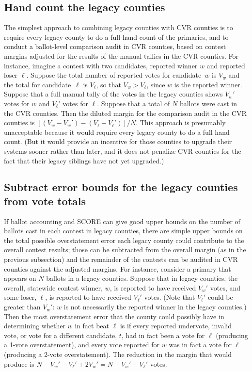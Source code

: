 \documentclass[12pt]{article}
\begin{document}
\subsection{Hand count the legacy counties}
The simplest approach to combining legacy counties with CVR counties is to require every
legacy county to do a full hand count of the primaries, and to conduct a 
ballot-level comparison audit in CVR counties, based on contest margins adjusted for
the results of the manual tallies in the CVR counties.
For instance, imagine a contest with two candidates, reported winner $w$ and reported loser $\ell$.
Suppose the total number of reported votes for candidate~$w$ is $V_w$ 
and the total for candidate~$\ell$ is $V_\ell$, so that $V_w > V_\ell$, since 
$w$ is the reported winner.
Suppose that a full manual tally of the votes in the legacy counties shows $V_w'$ votes for $w$ and
$V_\ell'$ votes for $\ell$.
Suppose that a total of $N$ ballots were cast in the CVR counties.
Then the diluted margin for the comparison audit in the CVR counties is 
$[(V_w-V_w')-(V_\ell-V_\ell')]/N$.
This approach is presumably unacceptable because it would require every legacy county to do a full hand
count. 
(But it would provide an incentive for those counties to upgrade their systems
sooner rather than later, and it does not penalize CVR counties for the fact that their
legacy siblings have not yet upgraded.)

\subsection{Subtract error bounds for the legacy counties from vote totals}
If ballot accounting and SCORE can give good upper bounds on the number of ballots cast in
each contest in legacy counties, there are simple upper bounds on the total
possible overstatement error each legacy county could contribute to the overall contest
results; those can be subtracted from the overall margin (as in the previous subsection) and the
remainder of the contests can be audited in CVR counties against the adjusted margins.
For instance, consider a primary that appears on $N$ ballots in a legacy counties.
Suppose that in legacy counties, the overall, statewide contest winner, $w$, is reported to have received $V_w'$ votes, and some loser, $\ell$, is reported to have received $V_\ell'$ votes. 
(Note that $V_\ell'$ could be greater than $V_w'$: $w$ is not necessarily the reported winner in the legacy counties.)
Then the most overstatement error that the county could possibly have in determining whether
$w$ in fact beat $\ell$ is if every reported undervote, invalid vote, or vote for a different candidate, $t$, had 
in fact been a vote for $\ell$ (producing a 1-vote overstatement), and every vote reported for 
$w$ was in fact a vote for $\ell$ (producing a 2-vote overstatement).
The reduction in the margin that would produce is 
$N - V_w' - V_\ell' + 2V_w' = N + V_w' - V_\ell'$ votes.
\end{document}

